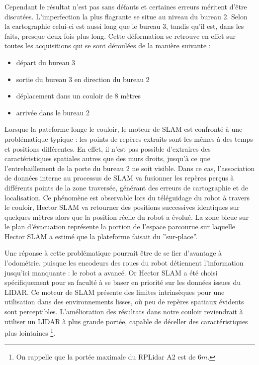   Cependant le résultat n'est pas sans défauts et certaines erreurs méritent d'être discutées. 
  L'imperfection la plus flagrante se situe au niveau du bureau 2. 
  Selon la cartographie celui-ci est aussi long que le bureau 3, tandis qu'il est, dans les faits, presque deux fois plus long. 
  Cette déformation se retrouve en effet sur toutes les acquisitions qui se sont déroulées de la manière suivante : 
  \begin{itemize}
   \item départ du bureau 3
   \item sortie du bureau 3 en direction du bureau 2
   \item déplacement dans un couloir de 8 mètres
   \item arrivée dans le bureau 2
  \end{itemize}

  Lorsque la pateforme longe le couloir, le moteur de SLAM est confronté à une problématique typique : les points de repères extraits sont les mêmes à des temps et positions différentes. 
  En effet, il n'est pas possible d'extraires des caractéristiques spatiales autres que des murs droits, jusqu'à ce que l'entrebaillement de la porte du bureau 2 ne soit visible. 
  Dans ce cas, l'association de données interne au processus de SLAM va fusionner les repères perçus à différents points de la zone traversée, générant des erreurs de cartographie et de localisation.  
  Ce phénomène est observable lors du téléguidage du robot à travers le couloir, \gls{Hector SLAM} va retourner des positions successives identiques sur quelques mètres alors que la position réelle du robot a évolué.
  La zone bleue sur le plan d'évacuation représente la portion de l'espace parcourue sur laquelle \gls{Hector SLAM} a estimé que la plateforme faisait du ''sur-place''. 
  
  Une réponse à cette problématique pourrait être de se fier d'avantage à l'odométrie. puisque les encodeurs des roues du robot détiennent l'information jusqu'ici manquante : le robot a avancé. 
  Or Hector SLAM a été choisi spécifiquement pour sa faculté à se baser en priorité sur les données issues du LIDAR. 
  Ce moteur de SLAM présente des limites intrinsèques pour une utilisation dans des environnements lisses, où peu de repères spatiaux évidents sont perceptibles.  
  L'amélioration des résultats dans notre couloir reviendrait à utiliser un LIDAR à plus grande portée, capable de déceller des caractéristiques plus lointaines
  \footnote{On rappelle que la portée maximale du RPLidar A2 est de $6m$.}.
  
